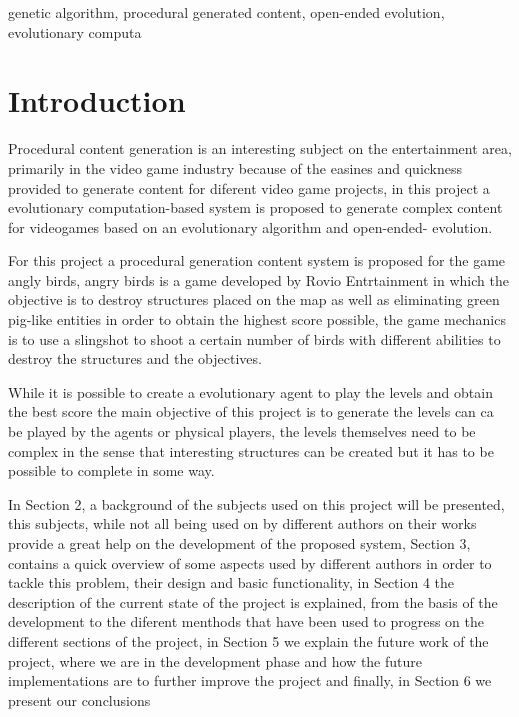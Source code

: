 \documentclass[conference]{IEEEtran}
\begin{document}
\begin{IEEEkeywords}
genetic algorithm, procedural generated content, open-ended evolution,
evolutionary computa
\end{IEEEkeywords}

\section{Introduction}
Procedural content generation is an interesting subject on the entertainment
area, primarily in the video game industry because of the easines and quickness
provided to generate content for diferent video game projects, in this project a
evolutionary computation-based system is proposed to generate complex content
for videogames based on an evolutionary algorithm and open-ended- evolution.

For this project a procedural generation content system is proposed for the game
angly birds, angry birds is a game developed by Rovio Entrtainment in which the
objective is to destroy structures placed on the map as well as eliminating
green pig-like entities in order to obtain the highest score possible, the game
mechanics is to use a slingshot to shoot a certain number of birds with
different abilities to destroy the structures and the objectives.
\cite{RovioEntertainmentCorporation2009}

While it is possible to create a evolutionary agent to play the levels and
obtain the best score the main objective of this project is to generate the
levels can ca be played by the agents or physical players, the levels themselves
need to be complex in the sense that interesting structures can be created but
it has to be possible to complete in some way.

In Section 2, a background of the subjects used on this project will be
presented, this subjects, while not all being used on by different authors on
their works provide a great help on the development of the proposed system,
Section 3, contains a quick overview of some aspects used by different authors
in order to tackle this problem, their design and basic functionality, in
Section 4 the description of the current state of the project is explained, from
the basis of the development to the diferent menthods that have been used to
progress on the different sections of the project, in Section 5 we explain the
future work of the project, where we are in the development phase and how the
future implementations are to further improve the project and finally, in
Section 6 we present our conclusions
 
\end{document}
